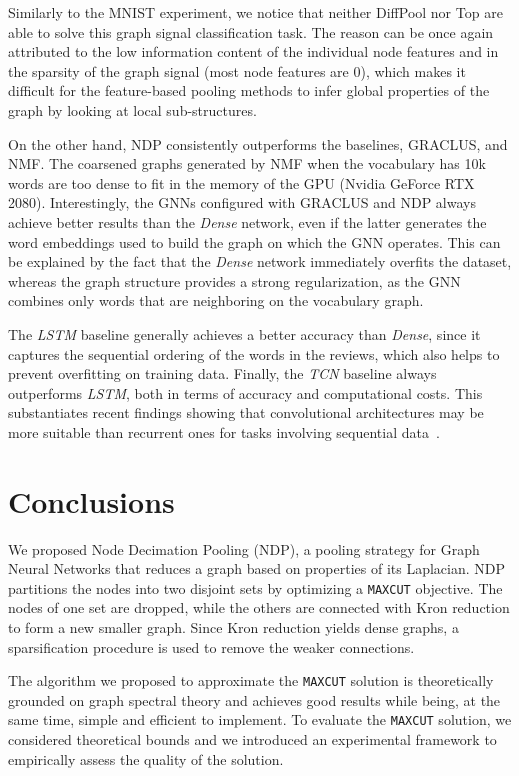 \documentclass[journal]{IEEEtran}
\newcommand{\maxcut}{\texttt{\small{MAXCUT}}}
\begin{document}
Similarly to the MNIST experiment, we notice that neither DiffPool nor Top are able to solve this graph signal classification task.
The reason can be once again attributed to the low information content of the individual node features and in the sparsity of the graph signal (most node features are 0), which makes it difficult for the feature-based pooling methods to infer global properties of the graph by looking at local sub-structures. 

On the other hand, NDP consistently outperforms the baselines, GRACLUS, and NMF. 
The coarsened graphs generated by NMF when the vocabulary has 10k words are too dense to fit in the memory of the GPU (Nvidia GeForce RTX 2080).
Interestingly, the GNNs configured with GRACLUS and NDP always achieve better results than the \textit{Dense} network, even if the latter generates the word embeddings used to build the graph on which the GNN operates. This can be explained by the fact that the \textit{Dense} network immediately overfits the dataset, whereas the graph structure provides a strong regularization, as the GNN combines only words that are neighboring on the vocabulary graph.  

The \textit{LSTM} baseline generally achieves a better accuracy than \textit{Dense}, since it captures the sequential ordering of the words in the reviews, which also helps to prevent overfitting on training data.
Finally, the \textit{TCN} baseline always outperforms \textit{LSTM}, both in terms of accuracy and computational costs. 
This substantiates recent findings showing that convolutional architectures may be more suitable than recurrent ones for tasks involving sequential data~\cite{bai2018empirical}.

\section{Conclusions}
\label{sec:conclusion}

We proposed Node Decimation Pooling (NDP), a pooling strategy for Graph Neural Networks that reduces a graph based on properties of its Laplacian. 
NDP partitions the nodes into two disjoint sets by optimizing a \maxcut{} objective. 
The nodes of one set are dropped, while the others are connected with Kron reduction to form a new smaller graph. 
Since Kron reduction yields dense graphs, a sparsification procedure is used to remove the weaker connections.

The algorithm we proposed to approximate the \maxcut{} solution is theoretically grounded on graph spectral theory and achieves good results while being, at the same time, simple and efficient to implement.
To evaluate the \maxcut{} solution, we considered theoretical bounds and we introduced an experimental framework to empirically assess the quality of the solution.
\end{document}
